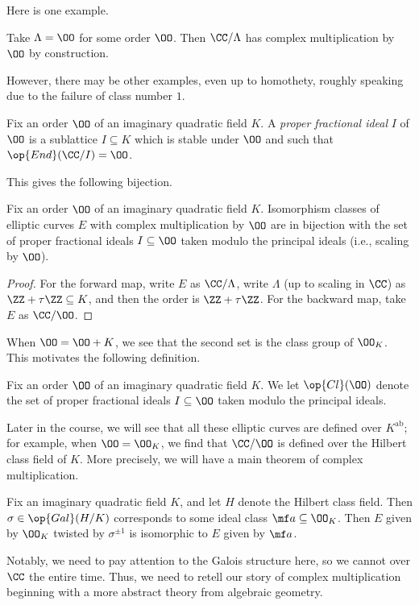 \documentclass[../notes.tex]{subfiles}
\begin{document}
Here is one example.
\begin{example}
	Take $\Lambda=\OO$ for some order $\OO$. Then $\CC/\Lambda$ has complex multiplication by $\OO$ by construction.
\end{example}
However, there may be other examples, even up to homothety, roughly speaking due to the failure of class number $1$.
\begin{definition}[proper]
	Fix an order $\OO$ of an imaginary quadratic field $K$. A \textit{proper fractional ideal} $I$ of $\OO$ is a sublattice $I\subseteq K$ which is stable under $\OO$ and such that $\op{End}(\CC/I)=\OO$.
\end{definition}
This gives the following bijection.
\begin{proposition}
	Fix an order $\OO$ of an imaginary quadratic field $K$. Isomorphism classes of elliptic curves $E$ with complex multiplication by $\OO$ are in bijection with the set of proper fractional ideals $I\subseteq\OO$ taken modulo the principal ideals (i.e., scaling by $\OO$).
\end{proposition}
\begin{proof}
	For the forward map, write $E$ as $\CC/\Lambda$, write $\Lambda$ (up to scaling in $\CC$) as $\ZZ+\tau\ZZ\subseteq K$, and then the order is $\ZZ+\tau\ZZ$. For the backward map, take $E$ as $\CC/\OO$.
\end{proof}
When $\OO=\OO+K$, we see that the second set is the class group of $\OO_K$. This motivates the following definition.
\begin{definition}
	Fix an order $\OO$ of an imaginary quadratic field $K$. We let $\op{Cl}(\OO)$ denote the set of proper fractional ideals $I\subseteq\OO$ taken modulo the principal ideals.
\end{definition}
Later in the course, we will see that all these elliptic curves are defined over $K^{\mathrm{ab}}$; for example, when $\OO=\OO_K$, we find that $\CC/\OO$ is defined over the Hilbert class field of $K$. More precisely, we will have a main theorem of complex multiplication.
\begin{theorem}
	Fix an imaginary quadratic field $K$, and let $H$ denote the Hilbert class field. Then $\sigma\in\op{Gal}(H/K)$ corresponds to some ideal class $\mf a\subseteq\OO_K$. Then $E$ given by $\OO_K$ twisted by $\sigma^{\pm1}$ is isomorphic to $E$ given by $\mf a$.
\end{theorem}
Notably, we need to pay attention to the Galois structure here, so we cannot over $\CC$ the entire time. Thus, we need to retell our story of complex multiplication beginning with a more abstract theory from algebraic geometry.
\end{document}
